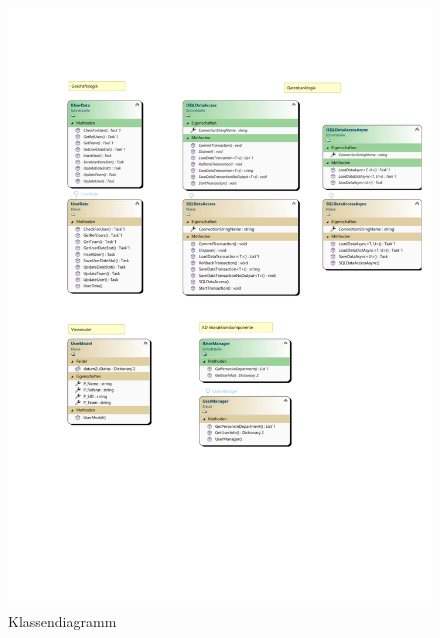\begin{figure}[htb]
    \centering
    \includegraphics[width=1\textwidth,angle=0]{anhang/abb/Klassendiagramm.pdf}
    \caption[Beschreibung]{Klassendiagramm}
    \label{abb:Klassendiagramm}
\end{figure}